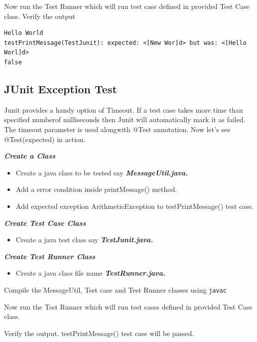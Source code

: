\documentclass[11pt,a4paper]{article}
\begin{document}
Now run the Test Runner which will run test case defined in provided Test Case class.
Verify the output
\begin{lstlisting}[numbers=none]
Hello World
testPrintMessage(TestJunit): expected: <[New Wor]d> but was: <[Hello Worl]d>
false
\end{lstlisting}

\subsection*{JUnit Exception Test}
Junit provides a handy option of Timeout. If a test case takes more time than specified numberof milliseconds then Junit will automatically mark it as failed. The timeout parameter is used alongwith @Test annotation. Now let's see @Test(expected) in action.

\emph{\textbf{Create a Class}}
\begin{itemize}
\item Create a java class to be tested say \emph{\textbf{MessageUtil.java.}}
\item Add a error condition inside printMessage() method.
\item Add expected exception ArithmeticException to testPrintMessage() test case.
\end{itemize}




\emph{\textbf{Create Test Case Class}}
\begin{itemize}
\item Create a java test class say \emph{\textbf{TestJunit.java.}}
\end{itemize}



\emph{\textbf{Create Test Runner Class}}
\begin{itemize}
\item Create a java class file name \emph{\textbf{TestRunner.java.}}
\end{itemize}



Compile the MessageUtil, Test case and Test Runner classes using \texttt{javac}

Now run the Test Runner which will run test cases defined in provided Test Case class.

Verify the output. testPrintMessage() test case will be passed.
\end{document}
